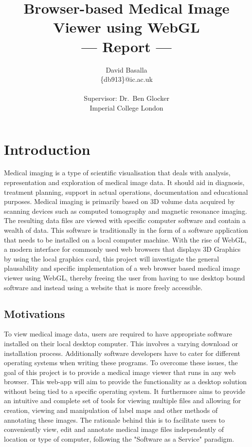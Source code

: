 \documentclass[a4paper,11pt,titlepage]{article}
\title{Browser-based Medical Image Viewer using WebGL \\\Large{--- Report ---}}
\author{David Basalla\\
  \{db913\}@ic.ac.uk\\ \\
  \small{Supervisor: Dr.\ Ben Glocker}\\
  \small{Imperial College London}
}
\begin{document}
\maketitle



\section{Introduction}

Medical imaging is a type of scientific visualisation that deals with analysis, representation and exploration of medical image data. It should aid in diagnosis, treatment planning, support in actual operations, documentation and educational purposes. Medical imaging is primarily based on 3D volume data acquired by scanning devices such as computed tomography and magnetic resonance imaging. The resulting data files are viewed with specific computer software and contain a wealth of data. This software is traditionally in the form of a software application that needs to be installed on a local computer machine. With the rise of WebGL, a modern interface for commonly used web browsers that displays 3D Graphics by using the local graphics card, this project will investigate the general plausability and specific implementation of a web browser based medical image viewer using WebGL, thereby freeing the user from having to use desktop bound software and instead using a website that is more freely accessible.

\subsection{Motivations}

To view medical image data, users are required to have appropriate software installed on their local desktop computer. This involves a varying download or installation process. Additionally software developers have to cater for different operating systems when writing these programs. To overcome these issues, the goal of this project is to provide a medical image viewer that runs in any web browser. This web-app will aim to provide the functionality as a desktop solution without being tied to a specific operating system. It furthermore aims to provide an intuitive and complete set of tools for viewing multiple files and allowing for creation, viewing and manipulation of label maps and other methods of annotating these images. The rationale behind this is to facilitate users to conveniently view, edit and annotate medical image files independently of location or type of computer, following the "Software as a Service" paradigm.
\end{document}
